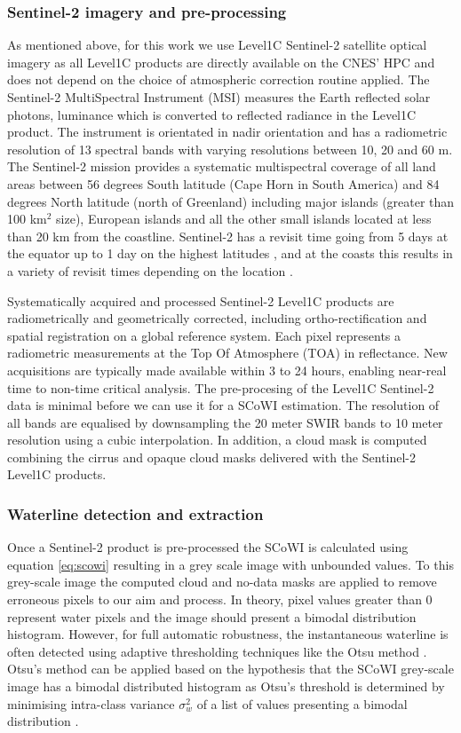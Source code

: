 \documentclass[remotesensing,article,submit,pdftex,moreauthors]{Definitions/mdpi}
\begin{document}
\subsubsection{Sentinel-2 imagery and pre-processing}
As mentioned above, for this work we use Level1C Sentinel-2 satellite optical imagery as all Level1C products are directly available on the CNES' HPC and does not depend on the choice of atmospheric correction routine applied. The Sentinel-2 MultiSpectral Instrument (MSI) measures the Earth reflected solar photons, luminance which is converted to reflected radiance in the Level1C product. The instrument is orientated in nadir orientation and has a radiometric resolution of 13 spectral bands with varying resolutions between 10, 20 and 60 m. The Sentinel-2 mission provides a systematic multispectral coverage of all land areas between 56 degrees South latitude (Cape Horn in South America) and 84 degrees North latitude (north of Greenland) including major islands (greater than 100 km$^2$ size), European islands and all the other small islands located at less than 20 km from the coastline. Sentinel-2 has a revisit time going from 5 days at the equator up to 1 day on the highest latitudes \citep{ESAreq}, and at the coasts this results in a variety of revisit times depending on the location \citep{BERGSMA2020}.

Systematically acquired and processed Sentinel-2 Level1C products are radiometrically and geometrically corrected, including ortho-rectification and spatial registration on a global reference system. Each pixel represents a radiometric measurements at the Top Of Atmosphere (TOA) in reflectance. New acquisitions are typically made available within 3 to 24 hours, enabling near-real time to non-time critical analysis. The pre-procesing of the Level1C Sentinel-2 data is minimal before we can use it for a SCoWI estimation. The resolution of all bands are equalised by downsampling the 20 meter SWIR bands to 10 meter resolution using a cubic interpolation. In addition, a cloud mask is computed combining the cirrus and opaque cloud masks delivered with the Sentinel-2 Level1C products.

\subsubsection{Waterline detection and extraction}
Once a Sentinel-2 product is pre-processed the SCoWI is calculated using equation \ref{eq:scowi} resulting in a grey scale image with unbounded values. To this grey-scale image the computed cloud and no-data masks are applied to remove erroneous pixels to our aim and process. In theory, pixel values greater than 0 represent water pixels and the image should present a bimodal distribution histogram. However, for full automatic robustness, the instantaneous waterline is often detected using adaptive thresholding techniques like the Otsu method \citep{Bishop_sub_pixel, VOS2019_sub}. Otsu's method can be applied based on the hypothesis that the SCoWI grey-scale image has a bimodal distributed histogram as Otsu's threshold is determined by minimising intra-class variance $\sigma_w^2$ of a list of values presenting a bimodal distribution \citep{OTSU1979}.
\end{document}
